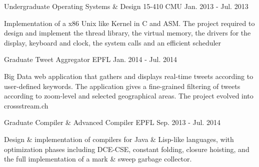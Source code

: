 


\begin{cventries}


\cventry
{Undergraduate} %
{Operating Systems \& Design 15-410} %
{CMU} %
{Jan. 2013 - Jul. 2013} %
{ %
\begin{cvitems}
\item {Implementation of a x86 Unix like Kernel in C and ASM. The project required to design and implement the thread library, the virtual memory, the drivers for the display, keyboard and clock, the system calls and an efficient scheduler}
\end{cvitems}
}

\cventry
{Graduate}
{Tweet Aggregator}
{EPFL}
{Jan. 2014 - Jul. 2014}
{
	\begin{cvitems}
	\item{Big Data web application that gathers and displays real-time tweets according to user-defined keywords. The application gives a fine-grained filtering of tweets according to zoom-level and selected geographical areas. The project evolved into crossstream.ch}
	\end{cvitems}
}

\cventry
{Graduate}
{Compiler \& Advanced Compiler}
{EPFL}
{Sep. 2013 - Jul. 2014}
{
	\begin{cvitems}
	\item{Design \& implementation of compilers for Java \& Lisp-like languages,
    with optimization phases including DCE-CSE, constant folding, closure hoisting, and the full implementation of a mark \& sweep garbage collector.}
	\end{cvitems}
}

\end{cventries}
